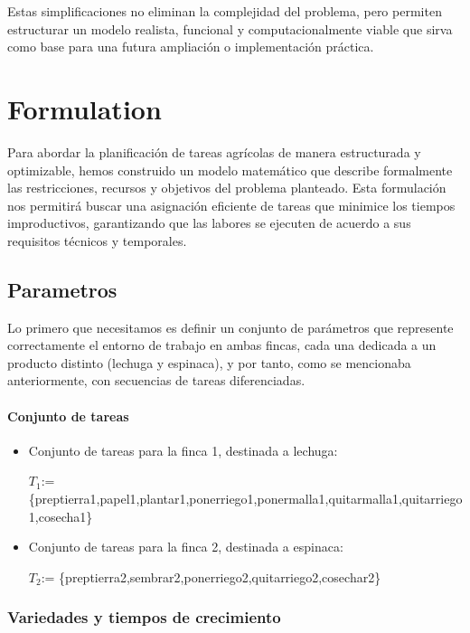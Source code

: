 Estas simplificaciones no eliminan la complejidad del problema, pero permiten estructurar un modelo realista, funcional y computacionalmente viable que sirva como base para una futura ampliación o implementación práctica.






\chapter*{Formulation}

Para abordar la planificación de tareas agrícolas de manera estructurada y optimizable, hemos construido un modelo matemático que describe formalmente las restricciones, recursos y objetivos del problema planteado.
Esta formulación nos permitirá buscar una asignación eficiente de tareas que minimice los tiempos improductivos, garantizando que las labores se ejecuten de acuerdo a sus requisitos técnicos y temporales.

\section*{Parametros}
Lo primero que necesitamos es definir un conjunto de parámetros que represente correctamente el entorno de trabajo en ambas fincas, cada una dedicada a un producto distinto (lechuga y espinaca),
y por tanto, como se mencionaba anteriormente, con secuencias de tareas diferenciadas.


\subsubsection{Conjunto de tareas}
\begin{itemize}
    \item Conjunto de tareas para la finca 1, destinada a lechuga:
    
    $T_1$:= \{preptierra1,papel1,plantar1,ponerriego1,ponermalla1,quitarmalla1,quitarriego1,cosecha1\}
    \item Conjunto de tareas para la finca 2, destinada a espinaca:
    
    $T_2$:= \{preptierra2,sembrar2,ponerriego2,quitarriego2,cosechar2\}
\end{itemize}

\subsection{Variedades y tiempos de crecimiento}

